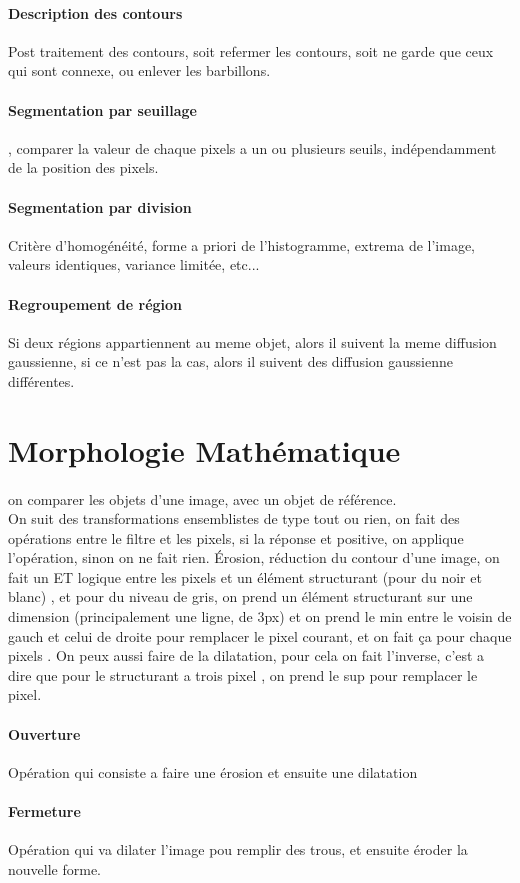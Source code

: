 \documentclass{article}
\begin{document}
\paragraph{Description des contours}
Post traitement des contours, soit refermer les contours, soit ne garde que ceux qui sont connexe, ou enlever les barbillons. 
\paragraph{Segmentation par seuillage}, comparer la valeur de chaque pixels a un ou plusieurs seuils, indépendamment de la position des pixels.
\paragraph{Segmentation par division} Critère d’homogénéité, forme a priori de l'histogramme, extrema de l'image, valeurs identiques, variance limitée, etc...

\paragraph{Regroupement de région} Si deux régions appartiennent au meme objet, alors il suivent la meme diffusion gaussienne, si ce n'est pas la cas, alors il suivent des diffusion gaussienne différentes. 
\section{Morphologie Mathématique} 
\paragraph{} 
on comparer les objets d'une image, avec un objet de référence.\\ On suit des transformations ensemblistes de type tout ou rien, on fait des opérations entre le filtre et les pixels, si la réponse et positive, on applique l'opération, sinon on ne fait rien. Érosion, réduction du contour d'une image, on fait un ET logique entre les pixels et un élément structurant (pour du noir et blanc) , et pour du niveau de gris, on prend un élément structurant sur une dimension (principalement une ligne, de 3px) et on prend le min entre le voisin de gauch et celui de droite pour remplacer le pixel courant, et on fait ça pour chaque pixels
. On peux aussi faire de la dilatation,  pour cela on fait l'inverse, c'est a dire que pour le structurant a trois pixel , on prend le sup pour remplacer le pixel.
\paragraph{Ouverture}
Opération qui consiste a faire une érosion et ensuite une dilatation
\paragraph{Fermeture}
Opération qui va dilater l'image pou remplir des trous, et ensuite éroder la  nouvelle forme. 
\end{document}
